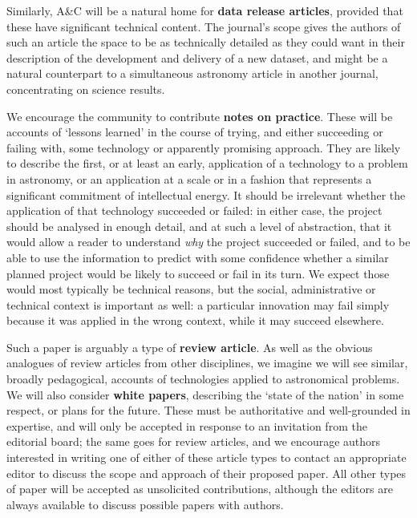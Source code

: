 Similarly,  A\&C will be a natural home for
\textbf{data release articles}, provided that these have significant technical content.  
The journal's scope gives the authors of such an
article the space to be as technically detailed as they
could want in their description of the development and delivery of a
new dataset, and might be a natural counterpart to a simultaneous
astronomy article in another journal,  concentrating on 
science results.

We encourage the community to contribute \textbf{notes on practice}.  These
will be accounts of `lessons learned' in the course of trying, and either
succeeding or failing with, some technology or apparently promising
approach. They are likely to describe the first,
or at least an early, application of a technology to a problem in
astronomy, or an application at a scale or in a fashion that represents
a significant commitment of intellectual energy.  It should
be irrelevant whether the application of that technology succeeded or
failed: in either case, the project should be analysed in enough
detail, and at such a level of abstraction, that it would allow a reader to
understand \emph{why} the project succeeded or failed, and to be able
to use the information to predict with some confidence whether a
similar planned project would be likely to succeed
or fail in its turn. We expect those would most typically be technical
reasons, but the social, administrative or technical context is 
important as well: a particular innovation may fail simply because it was
applied in the wrong context, while it may succeed elsewhere.

Such a paper is arguably a type of \textbf{review article}.  As well as the
obvious analogues of review articles from other disciplines, we
imagine we will see similar, broadly pedagogical, accounts of
technologies applied to astronomical problems.  We will also consider 
\textbf{white papers}, describing the
`state of the nation' in some respect, or plans for the future.  These must be authoritative and well-grounded in
expertise, and will only be accepted in response to an invitation from
the editorial board; the same goes for review articles, and we encourage authors
interested in writing one of either of these article types to contact an appropriate
editor to discuss the scope and approach of their proposed paper. All other types
of paper will be accepted as unsolicited contributions, although the editors are
always available to discuss possible papers with authors. 

